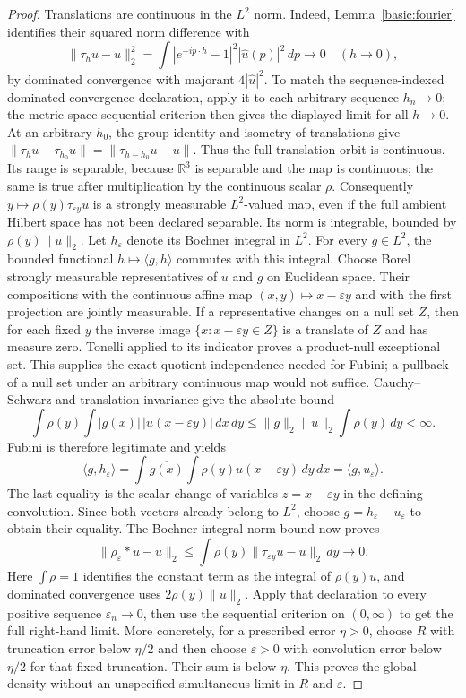 \documentclass[11pt,a4paper]{article}
\theoremstyle{definition}
\theoremstyle{remark}
\begin{document}
\begin{proof}
Translations are continuous in the $L^2$ norm. Indeed,
Lemma~\ref{basic:fourier} identifies their squared norm difference with
\[
 \|\tau_hu-u\|_2^2
 =\int|e^{-ip\cdot h}-1|^2|\widehat u(p)|^2\,dp\longrightarrow0
 \quad(h\to0),
\]
by dominated convergence with majorant $4|\widehat u|^2$.
To match the sequence-indexed dominated-convergence declaration, apply
it to each arbitrary sequence $h_n\to0$; the metric-space sequential
criterion then gives the displayed limit for all $h\to0$. At an arbitrary
$h_0$, the group identity and isometry of translations give
$\|\tau_hu-\tau_{h_0}u\|=\|\tau_{h-h_0}u-u\|$.
Thus the full translation orbit is continuous. Its range is separable,
because $\mathbb R^3$ is separable and the map is continuous; the same
is true after multiplication by the continuous scalar $\rho$.
Consequently $y\mapsto\rho(y)\tau_{\varepsilon y}u$ is a strongly
measurable $L^2$-valued map, even if the full ambient Hilbert space has
not been declared separable. Its norm is integrable, bounded by
$\rho(y)\|u\|_2$. Let $h_\varepsilon$ denote its Bochner integral in
$L^2$. For every $g\in L^2$, the bounded functional
$h\mapsto\langle g,h\rangle$ commutes with this integral.
Choose Borel strongly measurable representatives of $u$ and $g$ on
Euclidean space. Their compositions with the continuous affine map
$(x,y)\mapsto x-\varepsilon y$ and with the first projection are
jointly measurable. If a representative changes on a null set $Z$,
then for each fixed $y$ the inverse image
$\{x:x-\varepsilon y\in Z\}$ is a translate of $Z$ and has measure
zero. Tonelli applied to its indicator proves a product-null exceptional
set. This supplies the exact quotient-independence needed for Fubini;
a pullback of a null set under an arbitrary continuous map would not
suffice.
Cauchy--Schwarz and translation invariance give the absolute bound
\[
 \int\rho(y)\int |g(x)|\,|u(x-\varepsilon y)|\,dx\,dy
 \leq \|g\|_2\|u\|_2\int\rho(y)\,dy<\infty.
\]
Fubini is therefore legitimate and yields
\[
 \langle g,h_\varepsilon\rangle
 =\int\overline{g(x)}\int\rho(y)u(x-\varepsilon y)\,dy\,dx
 =\langle g,u_\varepsilon\rangle.
\]
The last equality is the scalar change of variables
$z=x-\varepsilon y$ in the defining convolution. Since both vectors
already belong to $L^2$, choose $g=h_\varepsilon-u_\varepsilon$ to
obtain their equality. The Bochner integral norm bound now proves
\[
 \|\rho_\varepsilon*u-u\|_2
 \leq\int\rho(y)\|\tau_{\varepsilon y}u-u\|_2\,dy
 \longrightarrow0.
\]
Here $\int\rho=1$ identifies the constant term as the integral of
$\rho(y)u$, and dominated convergence uses
$2\rho(y)\|u\|_2$. Apply that declaration to every positive sequence
$\varepsilon_n\to0$, then use the sequential criterion on $(0,\infty)$
to get the full right-hand limit. More concretely, for a prescribed error
$\eta>0$, choose $R$ with truncation error below $\eta/2$ and then
choose $\varepsilon>0$ with convolution error below $\eta/2$ for that
fixed truncation. Their sum is below $\eta$. This proves the global
density without an unspecified simultaneous limit in $R$ and
$\varepsilon$.


\end{proof}
\end{document}
